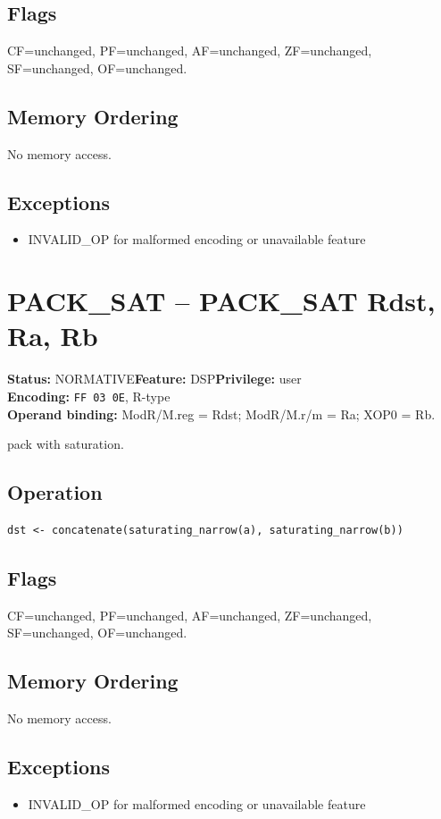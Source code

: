 \documentclass[10pt]{article}
\begin{document}
\subsection*{Flags}
CF=unchanged, PF=unchanged, AF=unchanged, ZF=unchanged, SF=unchanged, OF=unchanged.
\subsection*{Memory Ordering}
No memory access.
\subsection*{Exceptions}
\begin{itemize}
\item INVALID\_OP for malformed encoding or unavailable feature
\end{itemize}
\clearpage

\section{PACK\_SAT -- PACK\_SAT Rdst, Ra, Rb}
\textbf{Status:} NORMATIVE\quad \textbf{Feature:} DSP\quad \textbf{Privilege:} user\\
\textbf{Encoding:} \texttt{FF 03 0E}, R-type\\
\textbf{Operand binding:} ModR/M.reg = Rdst; ModR/M.r/m = Ra; XOP0 = Rb.

pack with saturation.

\subsection*{Operation}
\begin{lstlisting}
dst <- concatenate(saturating_narrow(a), saturating_narrow(b))
\end{lstlisting}
\subsection*{Flags}
CF=unchanged, PF=unchanged, AF=unchanged, ZF=unchanged, SF=unchanged, OF=unchanged.
\subsection*{Memory Ordering}
No memory access.
\subsection*{Exceptions}
\begin{itemize}
\item INVALID\_OP for malformed encoding or unavailable feature
\end{itemize}
\clearpage
\end{document}
